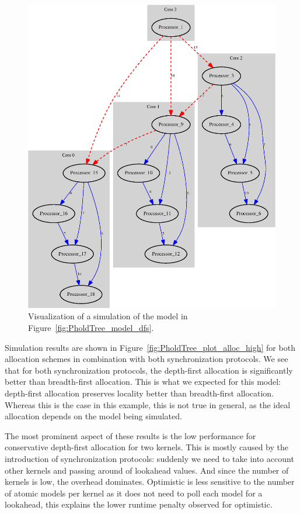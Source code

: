 \begin{figure}
    \center
    \includegraphics[width=\columnwidth]{fig/pholdtreed1n3t5000c4DFS.eps}
    \caption{Visualization of a simulation of the model in Figure~\ref{fig:PholdTree_model_dfs}.}
    \label{fig:pholdtree_visualize_parDFS}
\end{figure}

Simulation results are shown in Figure~\ref{fig:PholdTree_plot_alloc_high} for both allocation schemes in combination with both synchronization protocols.
We see that for both synchronization protocols, the depth-first allocation is significantly better than breadth-first allocation.
This is what we expected for this model: depth-first allocation preserves locality better than breadth-first allocation.
Whereas this is the case in this example, this is not true in general, as the ideal allocation depends on the model being simulated.

The most prominent aspect of these results is the low performance for conservative depth-first allocation for two kernels.
This is mostly caused by the introduction of synchronization protocols: suddenly we need to take into account other kernels and passing around of lookahead values.
And since the number of kernels is low, the overhead dominates.
Optimistic is less sensitive to the number of atomic models per kernel as it does not need to poll each model for a lookahead, this explains the lower runtime penalty observed for optimistic.

